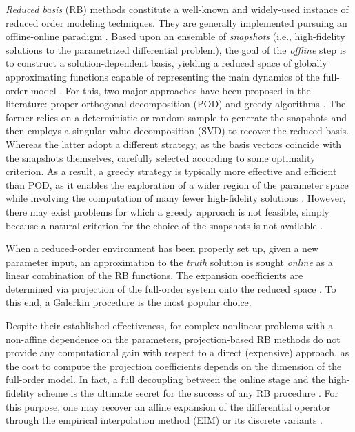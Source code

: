 \documentclass[12pt, a4paper, twoside, openright, notitlepage]{report}
\numberwithin{equation}{chapter}
\theoremstyle{theorem}
\theoremstyle{definition}
\theoremstyle{remark}
\theoremstyle{proposition}
\numberwithin{figure}{chapter}
\begin{document}
		\emph{Reduced basis} (RB) methods constitute a well-known and widely-used instance of reduced order modeling techniques. They are generally implemented pursuing an offline-online paradigm \cite{Mad06}. Based upon an ensemble of \emph{snapshots} (i.e., high-fidelity solutions to the parametrized differential problem), the goal of the \emph{offline} step is to construct a solution-dependent basis, yielding a reduced space of globally approximating functions capable of representing the main dynamics of the full-order model \cite{Bal14, Chen17}. For this, two major approaches have been proposed in the literature: proper orthogonal decomposition (POD) \cite{Vol08} and greedy algorithms \cite{HSZ14}. The former relies on a deterministic or random sample to generate the snapshots and then employs a singular value decomposition (SVD) to recover the reduced basis. Whereas the latter adopt a different strategy, as the basis vectors coincide with the snapshots themselves, carefully selected according to some optimality criterion. As a result, a greedy strategy is typically more effective and efficient than POD, as it enables the exploration of a wider region of the parameter space while involving the computation of many fewer high-fidelity solutions \cite{HSR16}. However, there may exist problems for which a greedy approach is not feasible, simply because a natural criterion for the choice of the snapshots is not available \cite{Bal14}. %
		
		When a reduced-order environment has been properly set up, given a new parameter input, an approximation to the \emph{truth} solution is sought \emph{online} as a linear combination of the RB functions. The expansion coefficients are determined via projection of the full-order system onto the reduced space \cite{Buf12}. To this end, a Galerkin procedure is the most popular choice. 
		
		Despite their established effectiveness, for complex nonlinear problems with a non-affine dependence on the parameters, projection-based RB methods do not provide any computational gain with respect to a direct (expensive) approach, as the cost to compute the projection coefficients depends on the dimension of the full-order model. In fact, a full decoupling between the online stage and the high-fidelity scheme is the ultimate secret for the success of any RB procedure \cite{QMN15}. For this purpose, one may recover an affine expansion of the differential operator through the empirical interpolation method (EIM) \cite{Bar04} or its discrete variants \cite{Cha10, NMA15}. 
		
\end{document}
